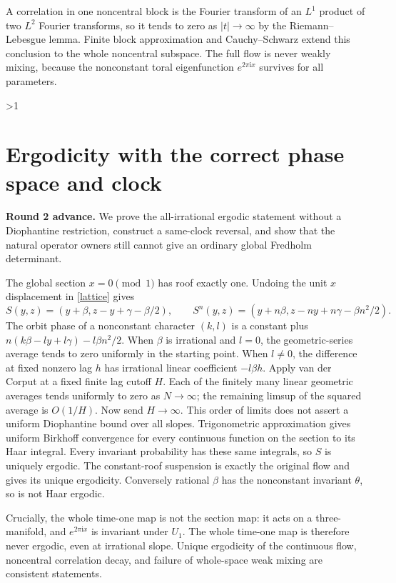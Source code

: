 \documentclass[10pt]{article}
\newcommand{\ii}{\mathrm i}
\begin{document}
A correlation in one noncentral block is the Fourier transform of an
$L^1$ product of two $L^2$ Fourier transforms, so it tends to zero as
$|t|\to\infty$ by the Riemann--Lebesgue lemma. Finite block approximation
and Cauchy--Schwarz extend this conclusion to the whole noncentral
subspace. The full flow is never weakly mixing, because the nonconstant
toral eigenfunction $e^{2\pi\ii x}$ survives for all parameters.
\fi

\ifnum\CRevisionRound>1
\section{Ergodicity with the correct phase space and clock}
\noindent\textbf{Round 2 advance.}
We prove the all-irrational ergodic statement without a Diophantine
restriction, construct a same-clock reversal, and show that the natural
operator owners still cannot give an ordinary global Fredholm determinant.

The global section $x=0\pmod1$ has roof exactly one. Undoing the unit
$x$ displacement in \eqref{lattice} gives
\[
 S(y,z)=(y+\beta,z-y+\gamma-\beta/2),\qquad
 S^n(y,z)=(y+n\beta,z-ny+n\gamma-\beta n^2/2).
\]
The orbit phase of a nonconstant character $(k,l)$ is a constant plus
$n(k\beta-ly+l\gamma)-l\beta n^2/2$. When $\beta$ is irrational and
$l=0$, the geometric-series average tends to zero uniformly in the
starting point. When $l\ne0$, the difference at fixed nonzero lag $h$
has irrational linear coefficient $-l\beta h$. Apply van der Corput at a
fixed finite lag cutoff $H$. Each of the finitely many linear geometric
averages tends uniformly to zero as $N\to\infty$; the remaining limsup
of the squared average is $O(1/H)$. Now send $H\to\infty$. This order of
limits does not assert a uniform Diophantine bound over all slopes.
Trigonometric approximation gives uniform Birkhoff convergence for every
continuous function on the section to its Haar integral. Every invariant
probability has these same integrals, so $S$ is uniquely ergodic.
The constant-roof suspension is exactly the original flow and gives its
unique ergodicity. Conversely rational $\beta$ has the nonconstant
invariant $\theta$, so is not Haar ergodic.

Crucially, the whole time-one map is not the section map: it acts on a
three-manifold, and $e^{2\pi\ii x}$ is invariant under $U_1$. The whole
time-one map is therefore never ergodic, even at irrational slope.
Unique ergodicity of the continuous flow, noncentral correlation decay,
and failure of whole-space weak mixing are consistent statements.
\end{document}
